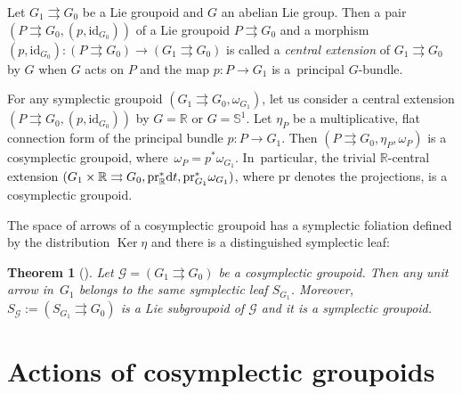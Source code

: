 \documentclass[10pt,a4paper]{amsart}
\numberwithin{equation}{section}
\newtheorem{Theorem}{Theorem}[section]
\begin{document}
\begin{Example}
 Let $G_1\rightrightarrows G_0$ be a Lie groupoid and $G$ an abelian Lie group. Then a pair $({P\rightrightarrows G_0},\allowbreak (p,\textrm{id}_{G_0}))$ of a Lie groupoid $P\rightrightarrows G_0$ and a morphism $(p,\textrm{id}_{G_0})\colon (P\rightrightarrows G_0)\!\to\!{(G_1\rightrightarrows G_0)}$ is called a \textit{central extension} of $G_1\rightrightarrows G_0$ by $G$ when $G$ acts on $P$ and the map $p\colon P\to G_1$ is a~principal $G$-bundle.

 For any symplectic groupoid $(G_1\rightrightarrows G_0, \omega_{G_1})$, let us consider a central extension $({P\rightrightarrows G_0},\allowbreak (p,\textrm{id}_{G_0}))$ by $G=\mathbb{R}$ or $G=\mathbb{S}^1$. Let $\eta_P$ be a multiplicative, flat connection form of the principal bundle $p\colon P\to G_1$. Then $(P\rightrightarrows G_0,\eta_P,\omega_P)$ is a cosymplectic groupoid, where~${\omega_P=p^\ast\omega_{G_1}}$. In~particular, the trivial $\mathbb{R}$-central extension $(G_1\times\mathbb{R}\rightrightarrows G_0,\textrm{pr}_\mathbb{R}^\ast {\rm d}t,\textrm{pr}_{G_1}^\ast\omega_{G_1})$, where $\textrm{pr}$ denotes the projections, is a cosymplectic groupoid.
\end{Example}

The space of arrows of a cosymplectic groupoid has a symplectic foliation defined by the distribution $\operatorname{Ker}\eta$ and there is a distinguished symplectic leaf:
\begin{Theorem}[\cite{fernandes2023cosymplectic}]\label{thm:1}
 Let $\mathcal{G}=(G_1\rightrightarrows G_0)$ be a cosymplectic groupoid. Then any unit arrow in~$G_1$ belongs to the same symplectic leaf $S_{G_1}$. Moreover, $S_\mathcal{G}:=(S_{G_1}\rightrightarrows G_0)$ is a Lie subgroupoid of $\mathcal{G}$ and it is a symplectic groupoid.
\end{Theorem}

\section{Actions of cosymplectic groupoids}\label{action}
\end{document}
